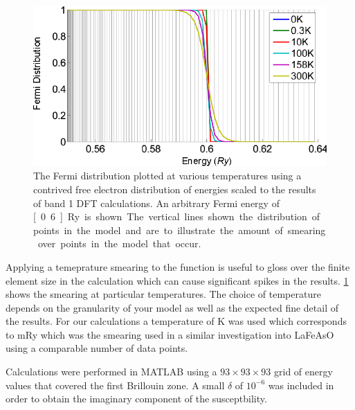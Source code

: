 \begin{figure}[h!]
    \begin{center}
        \includegraphics[scale=0.9]{Chapter3-dHvABaFe2P2/Figures/AngleDepMeasurements/SusceptibilityTempSmearing/SusceptibilityTempSmearing}
        \caption{The Fermi distribution plotted at various temperatures using a contrived free electron distribution of energies scaled to the results of band 1 DFT calculations. An arbitrary Fermi energy of \unit[0.6]{Ry} is shown. The vertical lines shown the distribution of points in the model and are to illustrate the amount of smearing over points in the model that occur.}
        \label{Fig:3:SusceptibilityTempSmearing}
    \end{center}
\end{figure}

Applying a temeprature smearing to the function is useful to gloss over the finite element size in the calculation which can cause significant spikes in the results. \Fig\ref{Fig:3:SusceptibilityTempSmearing} shows the smearing at particular temperatures. The choice of temperature depends on the granularity of your model as well as the expected fine detail of the results. For our calculations a temperature of \unit[158]{K} was used which corresponds to \unit[1]{mRy} which was the smearing used in a similar investigation into LaFeAsO using a comparable number of data points\cite{Mazin2008}.

Calculations were performed in MATLAB using a $93\times93\times93$ grid of energy values that covered the first Brillouin zone. A small $\delta$ of $10^{-6}$ was included in order to obtain the imaginary component of the susceptbility.

